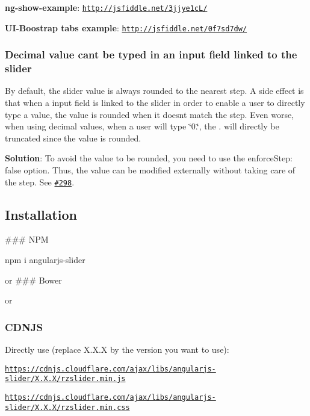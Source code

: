 {\bfseries ng-\/show-\/example}\+: \href{http://jsfiddle.net/3jjye1cL/}{\tt http\+://jsfiddle.\+net/3jjye1c\+L/}

{\bfseries U\+I-\/\+Boostrap tabs example}\+: \href{http://jsfiddle.net/0f7sd7dw/}{\tt http\+://jsfiddle.\+net/0f7sd7dw/}

\subsubsection*{Decimal value can\textquotesingle{}t be typed in an input field linked to the slider}

By default, the slider value is always rounded to the nearest step. A side effect is that when a input field is linked to the slider in order to enable a user to directly type a value, the value is rounded when it doesn\textquotesingle{}t match the step. Even worse, when using decimal values, when a user will type \char`\"{}0.\char`\"{}, the {\ttfamily .} will directly be truncated since the value is rounded.

{\bfseries Solution}\+: To avoid the value to be rounded, you need to use the {\ttfamily enforce\+Step\+: false} option. Thus, the value can be modified externally without taking care of the step. See \href{https://github.com/angular-slider/angularjs-slider/issues/298}{\tt \#298}.

\subsection*{Installation}

\#\#\# N\+PM 
\begin{DoxyCode}
npm i angularjs-slider
\end{DoxyCode}
 or \#\#\# Bower 


or \subsubsection*{C\+D\+N\+JS}

Directly use (replace {\ttfamily X.\+X.\+X} by the version you want to use)\+:
\begin{DoxyItemize}
\item {\ttfamily \href{https://cdnjs.cloudflare.com/ajax/libs/angularjs-slider/X.X.X/rzslider.min.js}{\tt https\+://cdnjs.\+cloudflare.\+com/ajax/libs/angularjs-\/slider/\+X.\+X.\+X/rzslider.\+min.\+js}}
\item {\ttfamily \href{https://cdnjs.cloudflare.com/ajax/libs/angularjs-slider/X.X.X/rzslider.min.css}{\tt https\+://cdnjs.\+cloudflare.\+com/ajax/libs/angularjs-\/slider/\+X.\+X.\+X/rzslider.\+min.\+css}}
\end{DoxyItemize}

